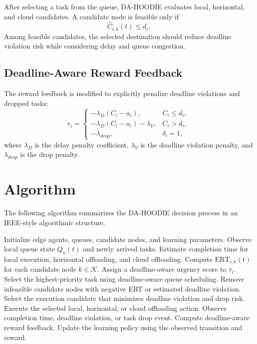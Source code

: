 \documentclass{article}
\begin{document}
After selecting a task from the queue, DA-HOODIE evaluates local, horizontal, and cloud candidates. A candidate node is feasible only if
\begin{equation}
    \widehat{C}_{i,k}(t)\leq d_i.
\end{equation}
Among feasible candidates, the selected destination should reduce deadline violation risk while considering delay and queue congestion.

\subsection{Deadline-Aware Reward Feedback}
\label{subsec:deadline_aware_reward_feedback}

The reward feedback is modified to explicitly penalize deadline violations and dropped tasks:
\begin{equation}
    r_i=
    \begin{cases}
    -\lambda_D(C_i-a_i), & C_i\leq d_i,\\
    -\lambda_D(C_i-a_i)-\lambda_V, & C_i>d_i,\\
    -\lambda_{drop}, & \delta_i=1,
    \end{cases}
\end{equation}
where $\lambda_D$ is the delay penalty coefficient, $\lambda_V$ is the deadline violation penalty, and $\lambda_{drop}$ is the drop penalty.

\section{Algorithm}
\label{sec:algorithm}

The following algorithm summarizes the DA-HOODIE decision process in an IEEE-style algorithmic structure.

\begin{algorithm}[t]
\caption{DA-HOODIE Deadline-Aware Hybrid Offloading}
\label{alg:da_hoodie}
\begin{algorithmic}[1]
\STATE Initialize edge agents, queues, candidate nodes, and learning parameters.
        \STATE Observe local queue state $Q_n(t)$ and newly arrived tasks.
            \STATE Estimate completion time for local execution, horizontal offloading, and cloud offloading.
            \STATE Compute $\mathrm{ERT}_{i,k}(t)$ for each candidate node $k\in\mathcal{K}$.
            \STATE Assign a deadline-aware urgency score to $\tau_i$.
        \ENDFOR
        \STATE Select the highest-priority task using deadline-aware queue scheduling.
        \STATE Remove infeasible candidate nodes with negative ERT or estimated deadline violation.
        \STATE Select the execution candidate that minimizes deadline violation and drop risk.
        \STATE Execute the selected local, horizontal, or cloud offloading action.
        \STATE Observe completion time, deadline violation, or task drop event.
        \STATE Compute deadline-aware reward feedback.
        \STATE Update the learning policy using the observed transition and reward.
    \ENDFOR
\ENDFOR
\end{algorithmic}
\end{algorithm}
\end{document}
